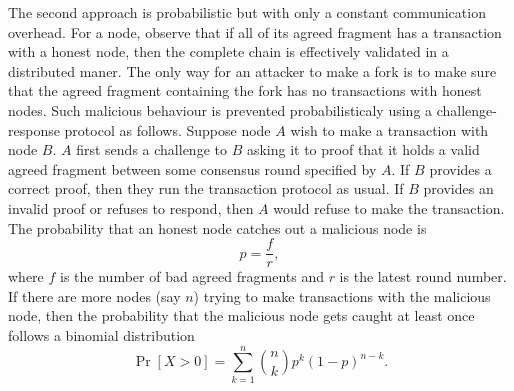 The second approach is probabilistic but with only a constant communication overhead.
For a node, observe that if all of its agreed fragment has a transaction with a honest node,
then the complete chain is effectively validated in a distributed maner.
The only way for an attacker to make a fork is to make sure that the agreed fragment containing the fork has no transactions with honest nodes.
Such malicious behaviour is prevented probabilisticaly using a challenge-response protocol as follows.
Suppose node $A$ wish to make a transaction with node $B$.
$A$ first sends a challenge to $B$ asking it to proof that it holds a valid agreed fragment between some consensus round specified by $A$.
If $B$ provides a correct proof, then they run the transaction protocol as usual.
If $B$ provides an invalid proof or refuses to respond,
then $A$ would refuse to make the transaction.
The probability that an honest node catches out a malicious node is 
$$p = \frac{f}{r},$$
where $f$ is the number of bad agreed fragments and $r$ is the latest round number.
If there are more nodes (say $n$) trying to make transactions with the malicious node,
then the probability that the malicious node gets caught at least once follows a binomial distribution
$$\Pr[X > 0] = \sum_{k = 1}^{n}\binom{n}{k}p^k (1 - p)^{n - k}.$$









